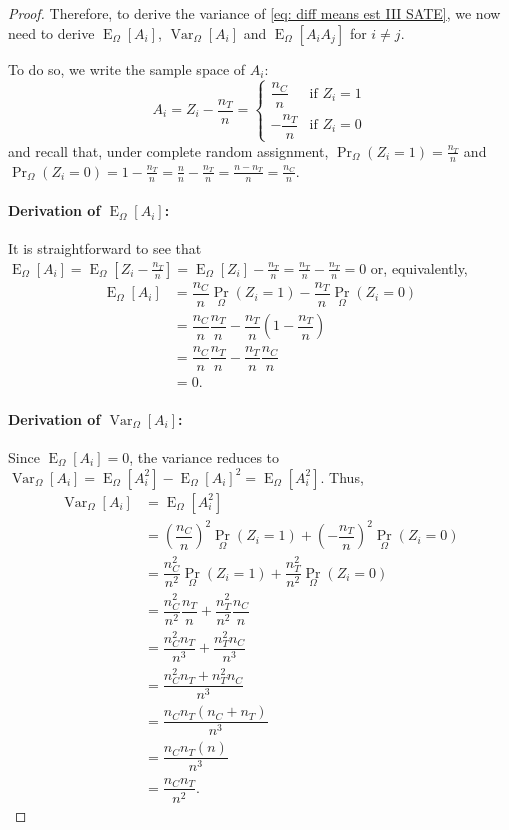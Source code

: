 \documentclass[12pt,leqno]{article}
\theoremstyle{newstyle}
\DeclareMathOperator{\E}{\mathrm{E}}
\DeclareMathOperator{\Var}{\mathrm{Var}}
\newcommand{\EZ}{\E_{\Omega}}    \newcommand{\VarZ}{\Var_{\Omega}}  %
\renewcommand{\Pr}{\operatorname{Pr}}
\begin{document}
\begin{proof}
Therefore, to derive the variance of \eqref{eq: diff means est III SATE}, we now need to derive $\EZ[A_i]$, $\VarZ[A_i]$ and $\EZ[A_i A_j]$ for $i \neq j$.

To do so, we write the sample space of $A_i$:
\small
\begin{equation}
A_i = Z_i - \dfrac{n_T}{n} = 
\begin{cases}
\dfrac{n_C}{n} & \text{if } Z_i = 1 \\ 
-\dfrac{n_T}{n} & \text{if } Z_i = 0
\end{cases}
\end{equation}
\normalsize
and recall that, under complete random assignment, $\Pr_{\Omega}(Z_i = 1) = \frac{n_T}{n}$ and $\Pr_{\Omega}(Z_i = 0) = 1 - \frac{n_T}{n} = \frac{n}{n} - \frac{n_T}{n} = \frac{n - n_T}{n} = \frac{n_C}{n}$. 

\paragraph*{Derivation of $\EZ[A_i]$:} It is straightforward to see that $\EZ[A_i] = \EZ[Z_i - \frac{n_T}{n}] = \EZ[Z_i] - \frac{n_T}{n} = \frac{n_T}{n} - \frac{n_T}{n} = 0$ or, equivalently,
\small
\begin{align*}
\EZ\left[A_i\right] & = \dfrac{n_C}{n}\Pr_{\Omega}\left(Z_i = 1\right) - \dfrac{n_T}{n} \Pr_{\Omega}\left(Z_i = 0\right)  \\[1ex]
& = \dfrac{n_C}{n}\dfrac{n_T}{n} - \dfrac{n_T}{n} \left(1 - \dfrac{n_T}{n}\right) \\[1ex]
& = \dfrac{n_C}{n}\dfrac{n_T}{n} - \dfrac{n_T}{n} \dfrac{n_C}{n} \\[1ex] 
& = 0.
\end{align*}
\normalsize

\paragraph*{Derivation of $\VarZ[A_i]$:} Since $\EZ[A_i] = 0$, the variance reduces to $\VarZ[A_i] = \EZ[A_i^2] - \EZ[A_i]^2 = \EZ[A_i^2]$. Thus,
\small
\begin{align*}
\VarZ\left[A_i\right] & = \EZ\left[A_i^2\right] \\[1ex]
& = \left(\dfrac{n_C}{n}\right)^2 \Pr_{\Omega}\left(Z_i = 1\right) + \left(-\dfrac{n_T}{n}\right)^2 \Pr_{\Omega}\left(Z_i = 0\right) \\[1ex]
& = \dfrac{n_C^2}{n^2} \Pr_{\Omega}\left(Z_i = 1\right) + \dfrac{n_T^2}{n^2} \Pr_{\Omega}\left(Z_i = 0\right) \\[1ex]
& = \dfrac{n_C^2}{n^2} \dfrac{n_T}{n} + \dfrac{n_T^2}{n^2} \dfrac{n_C}{n} \\[1ex]
& = \dfrac{n_C^2 n_T}{n^3} + \dfrac{n_T^2 n_C}{n^3} \\[1ex]
& = \dfrac{n_C^2 n_T + n_T^2 n_C}{n^3} \\[1ex]
& = \dfrac{n_C n_T\left(n_C + n_T\right)}{n^3} \\[1ex]
& = \dfrac{n_C n_T\left(n\right)}{n^3} \\[1ex]
& = \dfrac{n_C n_T}{n^2}.
\end{align*}
\normalsize


\end{proof}
\end{document}
